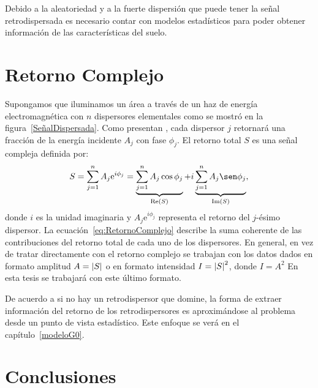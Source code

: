 Debido a la aleatoriedad y a la fuerte dispersión que puede tener la señal retrodispersada es necesario contar con modelos estadísticos para poder obtener información de las características del suelo.

\section{Retorno Complejo}
\label{RetornoComplejo}

Supongamos que iluminamos un área a través de un haz de energía electromagnética con $n$ dispersores elementales como se mostró en la figura~\ref{SeñalDispersada}. Como presentan \citet{FreryLibro2019}, cada dispersor $j$ retornará una fracción de la energía incidente $A_j$ con fase $\phi_j$. El retorno total $S$ es una señal compleja definida por:
\begin{align}
S = \sum_{j=1}^{n} A_j \mathrm{e}^{ i \phi_j} = 
\underbrace{{\sum_{j=1}^{n} A_j \cos \phi_j}}_{\Re{S}} + i \underbrace{ \sum_{j=1}^{n} A_j \sen \phi_j}_{\Im{S}}, 
\label{eq:RetornoComplejo}
\end{align}
donde $i$ es la unidad imaginaria y $A_j \mathrm{e}^{i \phi_j}$ representa el retorno del $j$-ésimo dispersor. La ecuación~\eqref{eq:RetornoComplejo} describe la suma coherente de las contribuciones del retorno total de cada uno de los dispersores. En general, en vez de tratar directamente con el retorno complejo se trabajan con los datos dados en formato amplitud 
$A=\left| S \right|$ 
o  en formato intensidad $I=\left| S \right|^2$, donde $I=A^2$ En esta tesis se trabajará con este último formato.

De acuerdo a \citet{Quegan1994} si no hay un retrodispersor que domine, la forma de extraer información del retorno de los retrodispersores es aproximándose al problema desde un punto de vista estadístico. Este enfoque se verá en el capítulo~\ref{modeloG0}.




\section{Conclusiones}

